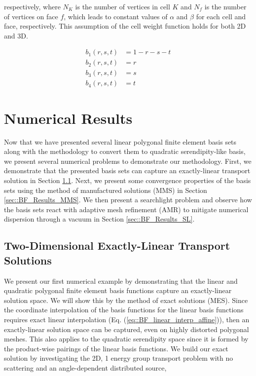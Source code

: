 \noindent respectively, where $N_K$ is the number of vertices in cell $K$ and $N_f$ is the number of vertices on face $f$, which leads to constant values of $\alpha$ and $\beta$ for each cell and face, respectively. This assumption of the cell weight function holds for both 2D and 3D.

\begin{equation}
\label{eq::3D_tetref_BF}
\begin{aligned}
	b_1(r,s,t) & = 1-r-s-t \\
	b_2(r,s,t) & = r \\
	b_3(r,s,t) & = s \\
	b_4(r,s,t) & = t
\end{aligned}
\end{equation}

\section{Numerical Results}
\label{sec::BF_Results}

Now that we have presented several linear polygonal finite element basis sets along with the methodology to convert them to quadratic serendipity-like basis, we present several numerical problems to demonstrate our methodology. First, we demonstrate that the presented basis sets can capture an exactly-linear transport solution in Section \ref{sec::BF_Results_Linear}. Next, we present some convergence properties of the basis sets using the method of manufactured solutions (MMS) in Section \ref{sec::BF_Results_MMS}. We then present a searchlight problem and observe how the basis sets react with adaptive mesh refinement (AMR) to mitigate numerical dispersion through a vacuum in Section \ref{sec::BF_Results_SL}.

\subsection{Two-Dimensional Exactly-Linear Transport Solutions}
\label{sec::BF_Results_Linear}

We present our first numerical example by demonstrating that the linear and quadratic polygonal finite element basis functions capture an exactly-linear solution space. We will show this by the method of exact solutions (MES). Since the coordinate interpolation of the basis functions for the linear basis functions requires exact linear interpolation (Eq. (\ref{eq::BF_linear_interp_affine})), then an exactly-linear solution space can be captured, even on highly distorted polygonal meshes. This also applies to the quadratic serendipity space since it is formed by the product-wise pairings of the linear basis functions. We build our exact solution by investigating the 2D, 1 energy group transport problem with no scattering and an angle-dependent distributed source,

